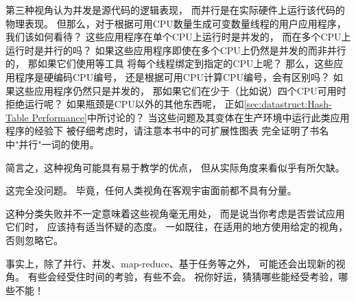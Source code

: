 \QuickQuizEnd

第三种视角认为并发是源代码的逻辑表现，
而并行是在实际硬件上运行该代码的物理表现。
但那么，对于根据可用CPU数量生成可变数量线程的用户应用程序，
我们该如何看待？
这些应用程序在单个CPU上运行时是并发的，
而在多个CPU上运行时是并行的吗？
如果这些应用程序即使在多个CPU上仍然是并发的而非并行的，
那如果它们使用等工具
将每个线程绑定到指定的CPU上呢？
那么，这些应用程序是硬编码CPU编号，
还是根据可用CPU计算CPU编号，会有区别吗？
如果这些应用程序仍然只是并发的，
那如果它们在少于（比如说）四个CPU可用时拒绝运行呢？
如果瓶颈是CPU以外的其他东西呢，
正如\cref{sec:datastruct:Hash-Table Performance}中所讨论的？
当这些问题及其变体在生产环境中运行此类应用程序的经验下
被仔细考虑时，请注意本书中的可扩展性图表
完全证明了书名中"并行"一词的使用。

简言之，这种视角可能具有易于教学的优点，
但从实际角度来看似乎有所欠缺。

这完全没问题。
毕竟，任何人类视角在客观宇宙面前都不具有分量。

这种分类失败并不一定意味着这些视角毫无用处，
而是说当你考虑是否尝试应用它们时，
应该持有适当怀疑的态度。
一如既往，在适用的地方使用给定的视角，否则忽略它。

事实上，除了并行、并发、map-reduce、基于任务等之外，
可能还会出现新的视角。
有些会经受住时间的考验，有些不会。
祝你好运，猜猜哪些能经受考验，哪些不能！
